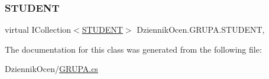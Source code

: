 \subsubsection{\texorpdfstring{S\+T\+U\+D\+E\+NT}{STUDENT}}
{\footnotesize\ttfamily virtual I\+Collection$<$\hyperlink{class_dziennik_ocen_1_1_s_t_u_d_e_n_t}{S\+T\+U\+D\+E\+NT}$>$ Dziennik\+Ocen.\+G\+R\+U\+P\+A.\+S\+T\+U\+D\+E\+NT\hspace{0.3cm}{\ttfamily [get]}, {\ttfamily [set]}}



The documentation for this class was generated from the following file\+:\begin{DoxyCompactItemize}
\item 
Dziennik\+Ocen/\hyperlink{_g_r_u_p_a_8cs}{G\+R\+U\+P\+A.\+cs}\end{DoxyCompactItemize}
